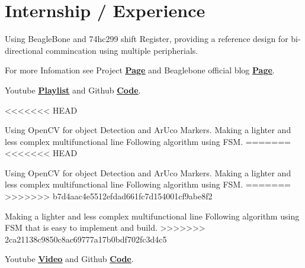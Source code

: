\documentclass[]{font}
\begin{document}
\hfill
\begin{minipage}[t]{0.69\textwidth} 


\section{Internship / Experience}
\vspace{\topsep} %

\vspace{\topsep} %
\begin{tightemize}
\item Using BeagleBone and 74hc299 shift Register, providing a reference design for bi-directional commincation using multiple peripherials.
\item For more Infomation see Project \textbf{\href{https://elinux.org/Beagleboard_gsoc_2019_bi-directional_progress}{\underline{Page}}} and Beaglebone official blog \textbf{\href{https://beagleboard.org/blog/2019-06-02-beagleboard-org-community-kicks-off-gsoc-2019-with-four-projects}{\underline{Page}}}.
\item Youtube \textbf{\href{https://www.youtube.com/watch?v=ZZDT6jNslqw&list=PLttoix_9Us2yHM4zNr08ynm4iwXZTgxam}{\underline{Playlist}}} and Github \textbf{\href{https://github.com/pranav083/pocket_beagle-work}{\underline{Code}}}. 
\end{tightemize}
\sectionsep


\begin{tightemize}
<<<<<<< HEAD
\item Using OpenCV for object Detection and ArUco Markers. Making a lighter and less complex multifunctional line Following algorithm using FSM.
=======
<<<<<<< HEAD
\item Using OpenCV for object Detection and ArUco Markers. Making a lighter and less complex multifunctional line Following algorithm using FSM.
=======
>>>>>>> b7d4aac4e5512efdad661fc7d154001cf9abe8f2
\item Making a lighter and less complex multifunctional line Following algorithm
using​ ​ FSM​ that is easy to implement and build.
>>>>>>> 2ca21138c9850c8ac69777a17b0bdf702fc3d4c5
\item Youtube \textbf{\href{https://youtu.be/FhUvQlrLWxc}{\underline{Video}}} and Github \textbf{\href{https://github.com/pranav083/FSM_code}{\underline{Code}}}. 
\end{tightemize}
\sectionsep



\end{minipage}
\end{document}
